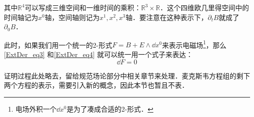 其中$\mathbb{R}^4$可以写成三维空间和一维时间的乘积：$\mathbb{R}^3\times\mathbb{R}$．这个四维欧几里得空间中的时间轴记为$x^0$轴，空间轴则记为$x^1, x^2, x^3$轴．要注意在这种表示下，$\partial_tB$就成了$\partial_0B$．

此时，如果我们用一个统一的2-形式$F=B+E\wedge\dd x^0$来表示电磁场\footnote{电场外积一个$\dd x^0$是为了凑成合适的2-形式．}，那么\autoref{ExtDer_eq3} 和\autoref{ExtDer_eq4} 就可以统一用一个式子来表达：
\begin{equation}
\dd F=0
\end{equation}

证明过程此处略去，留给规范场论部分中相关章节来处理．麦克斯韦方程组的剩下两个方程的表示，需要引入新的概念，因此本节也暂且不表．


